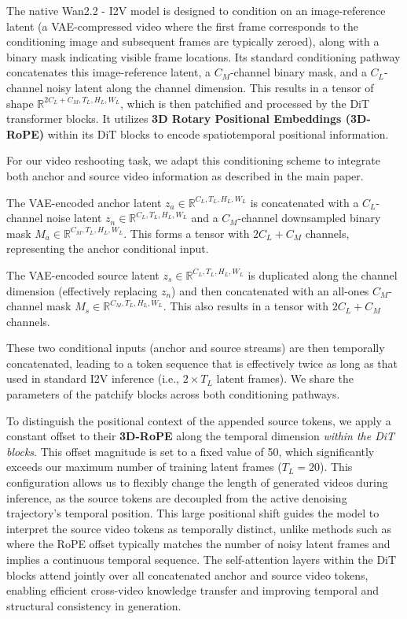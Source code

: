 The native Wan2.2 - I2V model is designed to condition on an image-reference latent (a VAE-compressed video where the first frame corresponds to the conditioning image and subsequent frames are typically zeroed), along with a binary mask indicating visible frame locations. Its standard conditioning pathway concatenates this image-reference latent, a $C_M$-channel binary mask, and a $C_L$-channel noisy latent along the channel dimension. This results in a tensor of shape $\mathbb{R}^{2C_L + C_M, T_L, H_L, W_L}$, which is then patchified and processed by the DiT transformer blocks. It utilizes \textbf{3D Rotary Positional Embeddings (3D-RoPE)} within its DiT blocks to encode spatiotemporal positional information.

For our video reshooting task, we adapt this conditioning scheme to integrate both anchor and source video information as described in the main paper.
\begin{description}[noitemsep, topsep=0pt, partopsep=0pt, leftmargin=1em, style=unboxed, font=\normalfont\bfseries]
    \item[Anchor Conditioning Stream] The VAE-encoded anchor latent $z_a \in \mathbb{R}^{C_L, T_L, H_L, W_L}$ is concatenated with a $C_L$-channel noise latent $z_n \in \mathbb{R}^{C_L, T_L, H_L, W_L}$ and a $C_M$-channel downsampled binary mask $M_a \in \mathbb{R}^{C_M, T_L, H_L, W_L}$. This forms a tensor with $2C_L + C_M$ channels, representing the anchor conditional input.
    \item[Source Conditioning Stream] The VAE-encoded source latent $z_s \in \mathbb{R}^{C_L, T_L, H_L, W_L}$ is duplicated along the channel dimension (effectively replacing $z_n$) and then concatenated with an all-ones $C_M$-channel mask $M_s \in \mathbb{R}^{C_M, T_L, H_L, W_L}$. This also results in a tensor with $2C_L + C_M$ channels.
\end{description}
These two conditional inputs (anchor and source streams) are then temporally concatenated, leading to a token sequence that is effectively twice as long as that used in standard I2V inference (i.e., $2 \times T_L$ latent frames). We share the parameters of the patchify blocks across both conditioning pathways.

To distinguish the positional context of the appended source tokens, we apply a constant offset to their \textbf{3D-RoPE} along the temporal dimension \textit{within the DiT blocks}. This offset magnitude is set to a fixed value of 50, which significantly exceeds our maximum number of training latent frames ($T_L=20$). This configuration allows us to flexibly change the length of generated videos during inference, as the source tokens are decoupled from the active denoising trajectory's temporal position. This large positional shift guides the model to interpret the source video tokens as temporally distinct, unlike methods such as~\cite{bai2025recammaster} where the RoPE offset typically matches the number of noisy latent frames and implies a continuous temporal sequence. The self-attention layers within the DiT blocks attend jointly over all concatenated anchor and source video tokens, enabling efficient cross-video knowledge transfer and improving temporal and structural consistency in generation.

